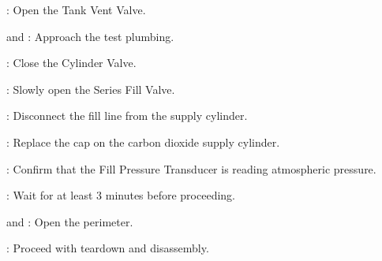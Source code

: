 \begin{checklist}
    \item \primary{}: Open the Tank Vent Valve.
    \item \primary{} and \secondary: Approach the test plumbing.
    \item \primary{}: Close the Cylinder Valve.
    \item \primary{}: Slowly open the Series Fill Valve.
    \item \primary{}: Disconnect the fill line from the supply cylinder.
    \item \primary{}: Replace the cap on the carbon dioxide supply cylinder.
    \item \daq{}: Confirm that the Fill Pressure Transducer is reading atmospheric pressure.
    \item \ops{}: Wait for at least 3 minutes before proceeding.
    \item \peri{} and \perii{}: Open the perimeter.
    \item \ops{}: Proceed with teardown and disassembly.

\end{checklist}



